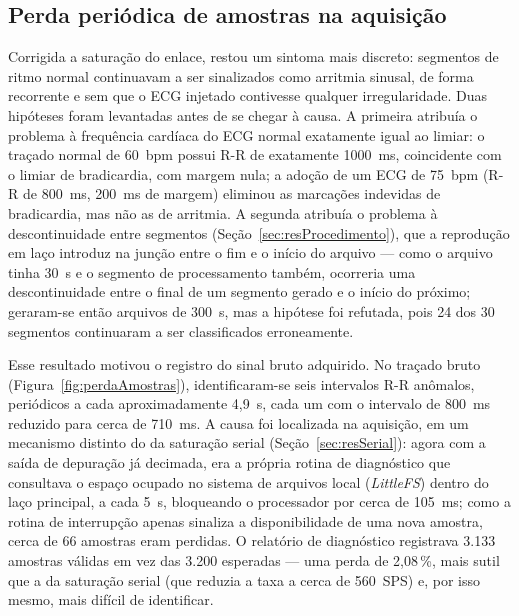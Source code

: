 \subsection{Perda periódica de amostras na aquisição}
\label{sec:resPerdaAmostras}

Corrigida a saturação do enlace, restou um sintoma mais discreto: segmentos de ritmo normal continuavam a ser sinalizados como arritmia sinusal, de forma recorrente e sem que o \acs{ECG} injetado contivesse qualquer irregularidade. Duas hipóteses foram levantadas antes de se chegar à causa. A primeira atribuía o problema à frequência cardíaca do \acs{ECG} normal exatamente igual ao limiar: o traçado normal de 60~bpm possui R-R de exatamente 1000~ms, coincidente com o limiar de bradicardia, com margem nula; a adoção de um \acs{ECG} de 75~bpm (R-R de 800~ms, 200~ms de margem) eliminou as marcações indevidas de bradicardia, mas não as de arritmia. A segunda atribuía o problema à descontinuidade entre segmentos (Seção~\ref{sec:resProcedimento}), que a reprodução em laço introduz na junção entre o fim e o início do arquivo — como o arquivo tinha 30~s e o segmento de processamento também, ocorreria uma descontinuidade entre o final de um segmento gerado e o início do próximo; geraram-se então arquivos de 300~s, mas a hipótese foi refutada, pois 24 dos 30 segmentos continuaram a ser classificados erroneamente.

Esse resultado motivou o registro do sinal bruto adquirido. No traçado bruto (Figura~\ref{fig:perdaAmostras}), identificaram-se seis intervalos R-R anômalos, periódicos a cada aproximadamente 4,9~s, cada um com o intervalo de 800~ms reduzido para cerca de 710~ms. A causa foi localizada na aquisição, em um mecanismo distinto do da saturação serial (Seção~\ref{sec:resSerial}): agora com a saída de depuração já decimada, era a própria rotina de diagnóstico que consultava o espaço ocupado no sistema de arquivos local (\textit{LittleFS}) dentro do laço principal, a cada 5~s, bloqueando o processador por cerca de 105~ms; como a rotina de interrupção apenas sinaliza a disponibilidade de uma nova amostra, cerca de 66 amostras eram perdidas. O relatório de diagnóstico registrava 3.133 amostras válidas em vez das 3.200 esperadas — uma perda de 2,08\,\%, mais sutil que a da saturação serial (que reduzia a taxa a cerca de 560~SPS) e, por isso mesmo, mais difícil de identificar.


